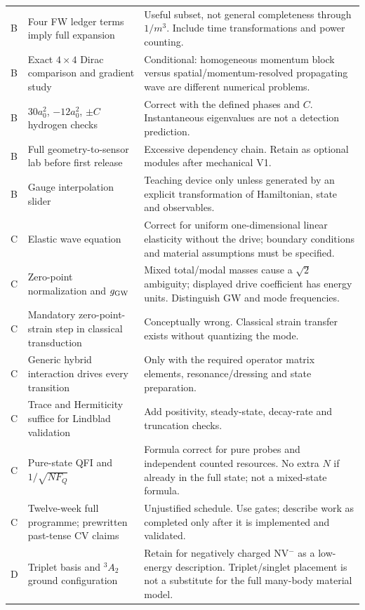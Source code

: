 \documentclass[a4paper,11pt]{article}
\begin{document}
\begin{longtable}{@{}P{10mm}P{54mm}P{89mm}@{}}
B & Four FW ledger terms imply full expansion & Useful subset, not general completeness through $1/m^3$. Include time transformations and power counting.\\
B & Exact $4\times4$ Dirac comparison and gradient study & Conditional: homogeneous momentum block versus spatial/momentum-resolved propagating wave are different numerical problems.\\
B & $30a_0^2$, $-12a_0^2$, $\pm C$ hydrogen checks & Correct with the defined phases and $C$. Instantaneous eigenvalues are not a detection prediction.\\
B & Full geometry-to-sensor lab before first release & Excessive dependency chain. Retain as optional modules after mechanical V1.\\
B & Gauge interpolation slider & Teaching device only unless generated by an explicit transformation of Hamiltonian, state and observables.\\
C & Elastic wave equation & Correct for uniform one-dimensional linear elasticity without the drive; boundary conditions and material assumptions must be specified.\\
C & Zero-point normalization and $g_{\rm GW}$ & Mixed total/modal masses cause a $\sqrt2$ ambiguity; displayed drive coefficient has energy units. Distinguish GW and mode frequencies.\\
C & Mandatory zero-point-strain step in classical transduction & Conceptually wrong. Classical strain transfer exists without quantizing the mode.\\
C & Generic hybrid interaction drives every transition & Only with the required operator matrix elements, resonance/dressing and state preparation.\\
C & Trace and Hermiticity suffice for Lindblad validation & Add positivity, steady-state, decay-rate and truncation checks.\\
C & Pure-state QFI and $1/\sqrt{NF_Q}$ & Formula correct for pure probes and independent counted resources. No extra $N$ if already in the full state; not a mixed-state formula.\\
C & Twelve-week full programme; prewritten past-tense CV claims & Unjustified schedule. Use gates; describe work as completed only after it is implemented and validated.\\
D & Triplet basis and $^3A_2$ ground configuration & Retain for negatively charged NV$^-$ as a low-energy description. Triplet/singlet placement is not a substitute for the full many-body material model.\\

\end{longtable}
\end{document}
